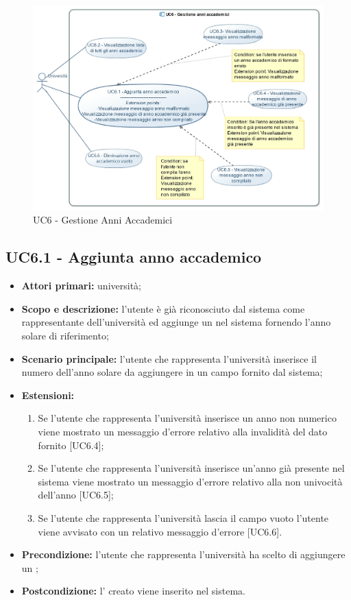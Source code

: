 \documentclass[AnalisiDeiRequisiti.tex]{subfiles}
\begin{document}
\begin{figure}[H]
	\centering
	\includegraphics[width=1.1\linewidth]{UC6.jpg}
	\caption{UC6 - Gestione Anni Accademici}
	\label{fig:UC6 - Gestione Anni Accademici}
\end{figure}

\subsection{UC6.1 - Aggiunta anno accademico}
\begin{itemize}
	\item \textbf{Attori primari:} università;
	\item \textbf{Scopo e descrizione:} l'utente è già riconosciuto dal sistema come rappresentante dell'università ed aggiunge un  nel sistema fornendo l'anno solare di riferimento;
	\item \textbf{Scenario principale:} l'utente che rappresenta l'università inserisce il numero dell'anno solare da aggiungere in un campo fornito dal sistema;
	\item \textbf{Estensioni:}
	\begin{enumerate}
		\item Se l'utente che rappresenta l'università inserisce un anno non numerico viene mostrato un messaggio d'errore relativo alla invalidità del dato fornito [UC6.4];
		\item Se l'utente che rappresenta l'università inserisce un'anno già presente nel sistema viene mostrato un messaggio d'errore relativo alla non univocità dell'anno [UC6.5];
		\item Se l'utente che rappresenta l'università lascia il campo vuoto l'utente viene avvisato con un relativo messaggio d'errore [UC6.6].
	\end{enumerate}
	\item \textbf{Precondizione:} l'utente che rappresenta l'università ha scelto di aggiungere un ; 
	\item \textbf{Postcondizione:} l' creato viene inserito nel sistema.
\end{itemize}
\end{document}
